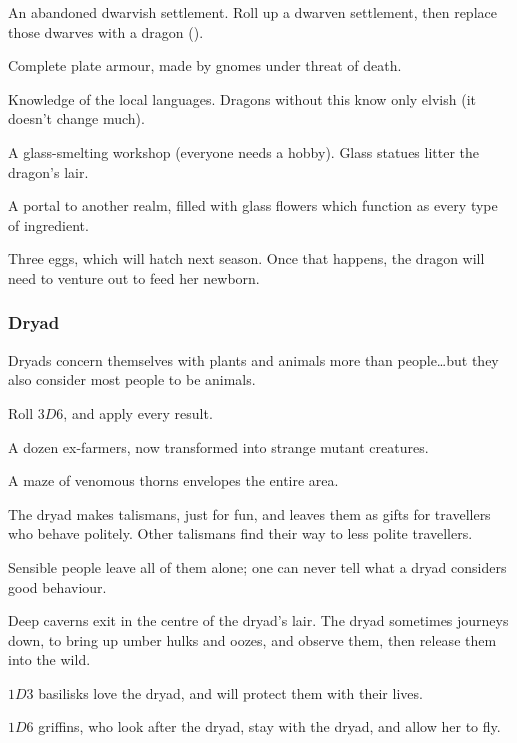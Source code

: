 \begin{multicols}{2}
\begin{dlist}
  \item
  An abandoned dwarvish settlement.
  Roll up a dwarven settlement, then replace those dwarves with a dragon ().
  \item
  Complete plate armour, made by gnomes under threat of death.
  \iftoggle{core}{(See the core rules, \autopageref{stackingarmour}.)}{}
  \item
  Knowledge of the local languages.
  Dragons without this know only elvish (it doesn't change much).
  \item
  A glass-smelting workshop (everyone needs a hobby).
  Glass statues litter the dragon's lair.
  \item
  A portal to another realm, filled with glass flowers which function as every type of \gls{ingredient}.
  \item
  Three eggs, which will hatch next season.
  Once that happens, the dragon will need to venture out to feed her newborn.
\end{dlist}

\subsubsection{Dryad}
\label{dryadPoint}

Dryads concern themselves with plants and animals more than people\ldots but they also consider most people to be animals.

Roll $3D6$, and apply every result.

\begin{dlist}
  \item
  A dozen ex-farmers, now transformed into strange mutant creatures.
  \item
  A maze of venomous thorns envelopes the entire area.
  \item
  The dryad makes \glspl{talisman}, just for fun, and leaves them as gifts for travellers who behave politely.
  Other \glspl{talisman} find their way to less polite travellers.

  Sensible people leave all of them alone; one can never tell what a dryad considers good behaviour.
  \item
  Deep caverns exit in the centre of the dryad's lair.
  The dryad sometimes journeys down, to bring up umber hulks and oozes, and observe them, then release them into the wild.
  \item
  $1D3$ basilisks love the dryad, and will protect them with their lives.
  \item
  $1D6$ griffins, who look after the dryad, stay with the dryad, and allow her to fly.
\end{dlist}


\end{multicols}
